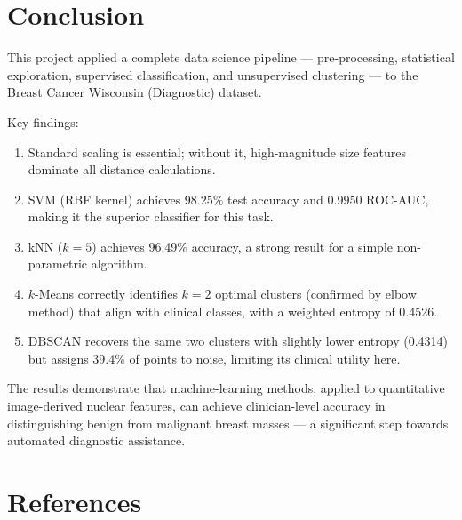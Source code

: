 \documentclass[12pt,a4paper]{article}
\begin{document}
\section{Conclusion}

This project applied a complete data science pipeline --- pre-processing, statistical
exploration, supervised classification, and unsupervised clustering --- to the Breast
Cancer Wisconsin (Diagnostic) dataset.

Key findings:
\begin{enumerate}[leftmargin=2em]
  \item Standard scaling is essential; without it, high-magnitude size features
        dominate all distance calculations.
  \item SVM (RBF kernel) achieves 98.25\% test accuracy and 0.9950 ROC-AUC, making
        it the superior classifier for this task.
  \item kNN ($k{=}5$) achieves 96.49\% accuracy, a strong result for a simple
        non-parametric algorithm.
  \item $k$-Means correctly identifies $k{=}2$ optimal clusters (confirmed by elbow
        method) that align with clinical classes, with a weighted entropy of 0.4526.
  \item DBSCAN recovers the same two clusters with slightly lower entropy (0.4314)
        but assigns 39.4\% of points to noise, limiting its clinical utility here.
\end{enumerate}

The results demonstrate that machine-learning methods, applied to quantitative
image-derived nuclear features, can achieve clinician-level accuracy in distinguishing
benign from malignant breast masses --- a significant step towards automated
diagnostic assistance.

\section*{References}
\end{document}
